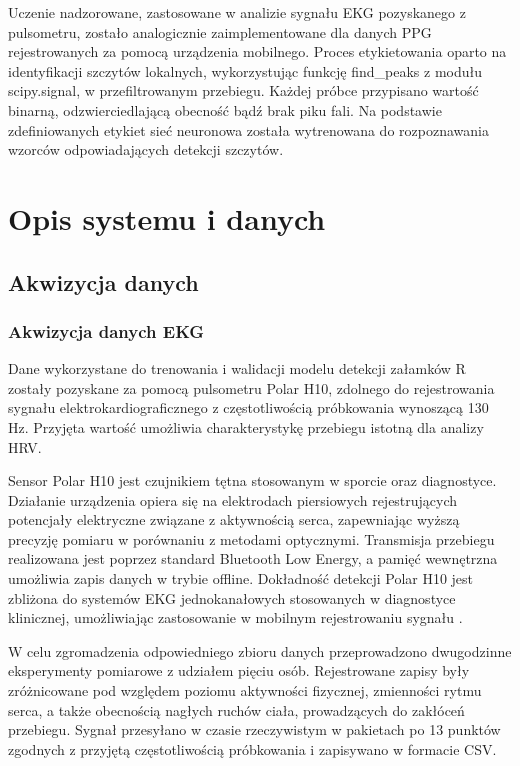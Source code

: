 \documentclass[journal]{IEEEtran}
\begin{document}
Uczenie nadzorowane, zastosowane w analizie sygnału EKG pozyskanego z pulsometru, zostało analogicznie zaimplementowane dla danych PPG rejestrowanych za pomocą urządzenia mobilnego. Proces etykietowania oparto na identyfikacji szczytów lokalnych, wykorzystując funkcję find\_peaks z modułu scipy.signal, w przefiltrowanym przebiegu. Każdej próbce przypisano wartość binarną, odzwierciedlającą obecność bądź brak piku fali. Na podstawie zdefiniowanych etykiet sieć neuronowa została wytrenowana do rozpoznawania wzorców odpowiadających detekcji szczytów.

\newpage
\section{Opis systemu i danych}
\subsection{Akwizycja danych}
\subsubsection{Akwizycja danych EKG}
Dane wykorzystane do trenowania i walidacji modelu detekcji załamków R zostały pozyskane za pomocą pulsometru Polar H10, zdolnego do rejestrowania sygnału elektrokardiograficznego z częstotliwością próbkowania wynoszącą 130 Hz. Przyjęta wartość umożliwia charakterystykę przebiegu istotną dla analizy HRV.

Sensor Polar H10 jest czujnikiem tętna stosowanym w sporcie oraz diagnostyce. Działanie urządzenia opiera się na elektrodach piersiowych rejestrujących potencjały elektryczne związane z aktywnością serca, zapewniając wyższą precyzję pomiaru w porównaniu z metodami optycznymi. Transmisja przebiegu realizowana jest poprzez standard Bluetooth Low Energy, a pamięć wewnętrzna umożliwia zapis danych w trybie offline. Dokładność detekcji Polar H10 jest zbliżona do systemów EKG jednokanałowych stosowanych w diagnostyce klinicznej, umożliwiając zastosowanie w mobilnym rejestrowaniu sygnału \cite{7}.

W celu zgromadzenia odpowiedniego zbioru danych przeprowadzono dwugodzinne eksperymenty pomiarowe z udziałem pięciu osób. Rejestrowane zapisy były zróżnicowane pod względem poziomu aktywności fizycznej, zmienności rytmu serca, a także obecnością nagłych ruchów ciała, prowadzących do zakłóceń przebiegu. Sygnał przesyłano w czasie rzeczywistym w pakietach po 13 punktów zgodnych z przyjętą częstotliwością próbkowania i zapisywano w formacie CSV. 
\end{document}

